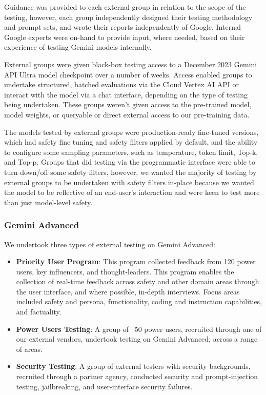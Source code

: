 Guidance was provided to each external group in relation to the scope of the testing, however, each group independently designed their testing methodology and prompt sets, and wrote their reports independently of Google. Internal Google experts were on-hand to provide input, where needed, based on their experience of testing Gemini models internally. 

External groups were given black-box testing access to a December 2023 Gemini API Ultra model checkpoint over a number of weeks. Access enabled groups to undertake structured, batched evaluations via the Cloud Vertex AI API or interact with the model via a chat interface, depending on the type of testing being undertaken. These groups weren’t given access to the pre-trained model, model weights, or queryable or direct external access to our pre-training data.

The models tested by external groups were production-ready fine-tuned versions, which had safety fine tuning and safety filters applied by default, and the ability to configure some sampling parameters, such as temperature, token limit, Top-k, and Top-p. Groups that did testing via the programmatic interface were able to turn down/off some safety filters, however, we wanted the majority of testing by external groups to be undertaken with safety filters in-place because we wanted the model to be reflective of an end-user’s interaction and were keen to test more than just model-level safety.

\subsubsection{Gemini Advanced} We undertook three types of external testing on Gemini Advanced:

\begin{itemize}
    \item \textbf{Priority User Program}: This program collected feedback from 120 power users, key influencers, and thought-leaders. This program enables the collection of real-time feedback across safety and other domain areas through the user interface, and where possible, in-depth interviews. Focus areas included safety and persona, functionality, coding and instruction capabilities, and factuality. 
\item \textbf{Power Users Testing}: A group of ~50 power users, recruited through one of our external vendors, undertook testing on Gemini Advanced, across a range of areas.
\item \textbf{Security Testing}:  A group of external testers with security backgrounds, recruited through a partner agency, conducted security and prompt-injection testing, jailbreaking, and user-interface security failures. 
\end{itemize}

